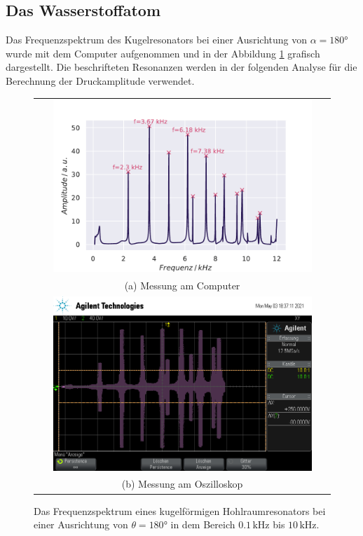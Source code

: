 \subsection{Das Wasserstoffatom}
Das Frequenzspektrum des Kugelresonators bei einer Ausrichtung von $\alpha = 180°$ wurde mit dem Computer aufgenommen und in der Abbildung \ref{fig:h180} grafisch dargestellt. 
Die beschrifteten Resonanzen werden in der folgenden Analyse für die Berechnung der Druckamplitude verwendet. 
\begin{figure}[H]
    \centering
    \begin{tabular}{c}
    \includegraphics[width=0.9\textwidth]{Daten/Wasserstoff/H_180.pdf} \\
    (a) Messung am Computer \\[6pt]
    \includegraphics[width=0.9\textwidth]{Daten/Wasserstoff/H_180.png} \\
    (b) Messung am Oszilloskop \\[6pt]
    \end{tabular}
    \caption{Das Frequenzspektrum eines kugelförmigen Hohlraumresonators bei einer Ausrichtung von $\theta = 180\si{°}$ in dem Bereich $0.1 \,\si{\kilo\hertz}$ bis $10 \,\si{\kilo\hertz}$. }
    \label{fig:h180}
\end{figure}

